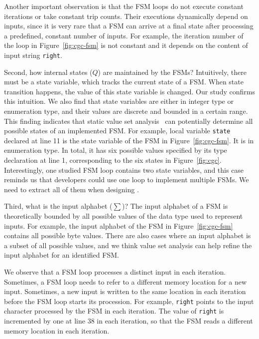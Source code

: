Another important observation is that
the FSM loops do not execute constant
iterations or take constant trip counts.
Their executions dynamically depend on inputs,
since it is very rare that a FSM can arrive at a final
state after processing a predefined, constant number of inputs.
For example, the iteration number of the
loop in Figure~\ref{fig:cgc-fsm}
is not constant and it
depends on the content of input string \texttt{right}.

Second, how internal states ($Q$) are maintained by the FSMs?
Intuitively, there must be a state variable, which tracks the current state of a FSM.
When state transition happens,
the value of this state variable is changed.
Our study confirms this intuition.
We also find that state variables are either in integer type or enumeration type,
and their values are discrete and bounded in a certain range.
This finding indicates that static value set analysis~\cite{DEEPVSA,VSA}
can potentially determine all possible states of an implemented FSM.
For example, local variable \texttt{state} declared at line 11
is the state variable of the FSM in Figure~\ref{fig:cgc-fsm}.
It is in enumeration type.
In total, it has six possible values
specified by its type declaration at line 1,
corresponding to the six states in Figure~\ref{fig:cgc}.
Interestingly, one studied FSM loop contains two state variables,
and this case reminds us that developers could use one loop
to implement multiple FSMs.
We need to extract all of them when designing \Tool{}.



Third, what is the input alphabet ($\sum$)?
The input alphabet of a FSM is theoretically bounded by all possible values
of the data type used to represent inputs.
For example, the input alphabet of the FSM
in Figure~\ref{fig:cgc-fsm} contains all possible byte values.
There are also cases where an input alphabet is a subset of all possible values,
and we think value set analysis can help refine
the input alphabet for an identified FSM.

We observe that a FSM loop processes a distinct input in each iteration.
Sometimes, a FSM loop needs to refer to a different memory location for a new input.
Sometimes, a new input is written to the same
location in each iteration before the FSM loop starts its procession.
For example, \texttt{right} points to the input character
processed by the FSM in each iteration.
The value of \texttt{right} is incremented by one at line 38 in each iteration,
so that the FSM reads a different memory location in each iteration.


